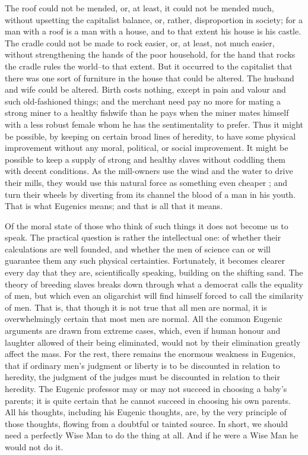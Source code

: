 \documentclass{book}
\begin{document}
The roof could not be mended, or, at least, it could not be mended much, without upsetting the capitalist balance, or, rather, disproportion in society; for a man with a roof is a man with a house, and to that extent his house is his castle. The cradle could not be made to rock easier, or, at least, not much easier, without strengthening the hands of the poor household, for the hand that rocks the cradle rules the world–to that extent. But it occurred to the capitalist that there was one sort of furniture in the house that could be altered. The husband and wife could be altered. Birth costs nothing, except in pain and valour and such old-fashioned things; and the merchant need pay no more for mating a strong miner to a healthy fishwife than he pays when the miner mates himself with a less robust female whom he has the sentimentality to prefer. Thus it might be possible, by keeping on certain broad lines of heredity, to have some physical improvement without any moral, political, or social improvement. It might be possible to keep a supply of strong and healthy slaves without coddling them with decent conditions. As the mill-owners use the wind and the water to drive their mills, they would use this natural force as something even cheaper ; and turn their wheels by diverting from its channel the blood of a man in his youth. That is what Eugenics means; and that is all that it means.

Of the moral state of those who think of such things it does not become us to speak. The practical question is rather the intellectual one: of whether their calculations are well founded, and whether the men of science can or will guarantee them any such physical certainties. Fortunately, it becomes clearer every day that they are, scientifically speaking, building on the shifting sand. The theory of breeding slaves breaks down through what a democrat calls the equality of men, but which even an oligarchist will find himself forced to call the similarity of men. That is, that though it is not true that all men are normal, it is overwhelmingly certain that most men are normal. All the common Eugenic arguments are drawn from extreme cases, which, even if human honour and laughter allowed of their being eliminated, would not by their elimination greatly affect the mass. For the rest, there remains the enormous weakness in Eugenics, that if ordinary men’s judgment or liberty is to be discounted in relation to heredity, the judgment of the judges must be discounted in relation to their heredity. The Eugenic professor may or may not succeed in choosing a baby’s parents; it is quite certain that he cannot succeed in choosing his own parents. All his thoughts, including his Eugenic thoughts, are, by the very principle of those thoughts, flowing from a doubtful or tainted source. In short, we should need a perfectly Wise Man to do the thing at all. And if he were a Wise Man he would not do it.
\end{document}
